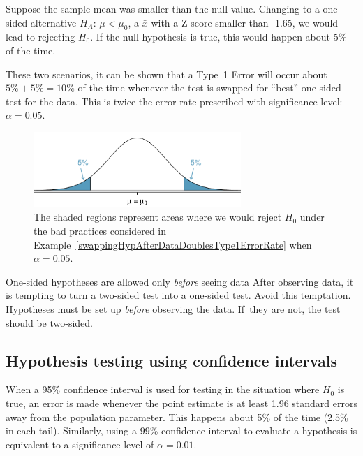 \begin{spacing}{1.5}
\begin{example}
Suppose the sample mean was smaller than the null value.  Changing to a one-sided alternative $H_A$: $\mu < \mu_0$, a $\bar{x}$ with a Z-score smaller than -1.65, we would lead to rejecting $H_0$. If the null hypothesis is true, this would happen about 5\% of the time.

These two scenarios, it can be shown that a Type~1 Error will occur about $5\%+5\%=10\%$ of the time whenever the test is swapped for ``best'' one-sided test for the data. This is twice the error rate prescribed with significance level: $\alpha=0.05$.

\begin{figure}
   \centering
   \includegraphics[width=0.7\textwidth]{ch_inference_foundations_oi_biostat/figures/type1ErrorDoublingExampleFigure/type1ErrorDoublingExampleFigure}
   \caption{The shaded regions represent areas where we would reject $H_0$ under the bad practices considered in Example~\ref{swappingHypAfterDataDoublesType1ErrorRate} when $\alpha = 0.05$.}
   \label{type1ErrorDoublingExampleFigure}
\end{figure}

\end{example}

\begin{caution}{One-sided hypotheses are allowed only \emph{before} seeing data}
{After observing data, it is tempting to turn a two-sided test into a one-sided test. Avoid this temptation. Hypotheses must be set up \emph{before} observing the data. If~they are not, the test should be two-sided.}
\end{caution}


\subsection{Hypothesis testing using confidence intervals}

When a 95\% confidence interval is used  for testing in the situation where $H_0$ is true, an error is made whenever the point estimate is at least 1.96 standard errors away from the population parameter. This happens about 5\% of the time (2.5\% in each tail). Similarly, using a 99\% confidence interval to evaluate a hypothesis is equivalent to a significance level of $\alpha = 0.01$.


\end{spacing}
